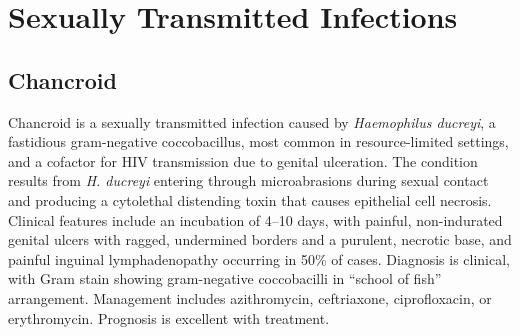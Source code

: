 \section{Sexually Transmitted Infections}








\label{sec:Sexually Transmitted Infections}

\subsection{Chancroid}
\label{sec:Chancroid}
Chancroid is a sexually transmitted infection caused by \textit{Haemophilus ducreyi}, a fastidious gram-negative coccobacillus, most common in resource-limited settings, and a cofactor for HIV transmission due to genital ulceration. The condition results from \textit{H. ducreyi} entering through microabrasions during sexual contact and producing a cytolethal distending toxin that causes epithelial cell necrosis. Clinical features include an incubation of 4--10 days, with painful, non-indurated genital ulcers with ragged, undermined borders and a purulent, necrotic base, and painful inguinal lymphadenopathy occurring in 50\% of cases. Diagnosis is clinical, with Gram stain showing gram-negative coccobacilli in ``school of fish'' arrangement. Management includes azithromycin, ceftriaxone, ciprofloxacin, or erythromycin. Prognosis is excellent with treatment.

